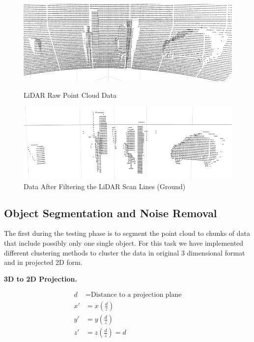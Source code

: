 \begin{figure}[!ht]
\centering
\begin{minipage}{0.49\textwidth}
  \centering
        \includegraphics[width=.9\linewidth]{images/ground_before2.png}
        \caption{LiDAR Raw Point Cloud Data}
        \label{fig:ground_before}
\end{minipage}%
\begin{minipage}{0.49\textwidth}
  \centering
        \includegraphics[width=.9\linewidth]{images/ground_after2.png}
        \caption{Data After Filtering the LiDAR Scan Lines (Ground)}
        \label{fig:after}
\end{minipage}%
\end{figure}





\subsection{Object Segmentation and Noise Removal}

The first during the testing phase is to segment the point cloud to chunks of data that include possibly only one single object.
For this task we have implemented different clustering methods to cluster the data in original 3 dimensional format and in projected 2D form.      




\textbf{3D to 2D Projection.}


\large 
\begin{align*}
d  & = \text{Distance to a projection plane} \\   
x' & =  x (\frac{d}{z}) \\  
y' & =  y (\frac{d}{z}) \\
z' & =  z (\frac{d}{z}) = d  
\end{align*}
\normalsize








